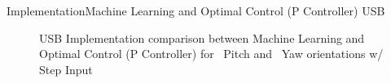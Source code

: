 \documentclass{beamer}
\begin{document}
%
\begin{frame}{Implementation}{Machine Learning and Optimal Control (P Controller) USB}
    \begin{figure}
      \centering
      \caption{USB Implementation comparison between Machine Learning and Optimal Control (P Controller) for ~Pitch and ~Yaw orientations w/ Step Input}
      \label{fig:LQRvADP_USB}
    \end{figure}
\end{frame}
\end{document}
